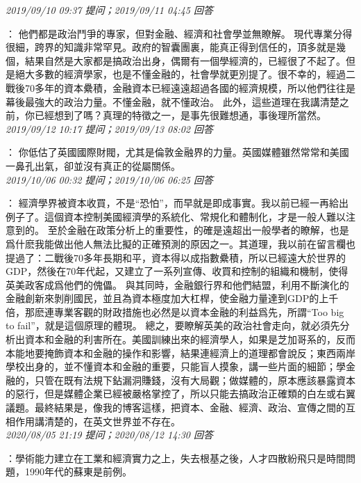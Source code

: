 \documentclass[twocolumn]{ctexart}
\begin{document}
\textit{\hfill\noindent\small 2019/09/10 09:37 提问；2019/09/11 04:45 回答}

：
他們都是政治鬥爭的專家，但對金融、經濟和社會學並無瞭解。 
現代專業分得很細，跨界的知識非常罕見。政府的智囊團裏，能真正得到信任的，頂多就是幾個，結果自然是大家都是搞政治出身，偶爾有一個學經濟的，已經很了不起了。但是絕大多數的經濟學家，也是不懂金融的，社會學就更別提了。很不幸的，經過二戰後70多年的資本纍積，金融資本已經遠遠超過各國的經濟規模，所以他們往往是幕後最強大的政治力量。不懂金融，就不懂政治。 
此外，這些道理在我講清楚之前，你已經想到了嗎？真理的特徵之一，是事先很難想通，事後理所當然。
\\

\textit{\hfill\noindent\small 2019/09/12 10:17 提问；2019/09/13 08:02 回答}

：
你低估了英國國際財閥，尤其是倫敦金融界的力量。英國媒體雖然常常和美國一鼻孔出氣，卻並沒有真正的從屬關係。
\\

\textit{\hfill\noindent\small 2019/10/06 00:32 提问；2019/10/06 06:25 回答}

：
經濟學界被資本收買，不是“恐怕”，而早就是即成事實。我以前已經一再給出例子了。這個資本控制美國經濟學的系統化、常規化和體制化，才是一般人難以注意到的。 
至於金融在政策分析上的重要性，的確是遠超出一般學者的瞭解，也是爲什麽我能做出他人無法比擬的正確預測的原因之一。其道理，我以前在留言欄也提過了：二戰後70多年長期和平，資本得以成指數纍積，所以已經遠大於世界的GDP，然後在70年代起，又建立了一系列宣傳、收買和控制的組織和機制，使得英美政客成爲他們的傀儡。 
與其同時，金融銀行界和他們結盟，利用不斷演化的金融創新來剝削國民，並且為資本極度加大杠桿，使金融力量達到GDP的上千倍，那麽連專業客觀的財政措施也必然是以資本金融的利益爲先，所謂“Too big to fail”，就是這個原理的體現。 
總之，要瞭解英美的政治社會走向，就必須先分析出資本和金融的利害所在。美國訓練出來的經濟學人，如果是芝加哥系的，反而本能地要掩飾資本和金融的操作和影響，結果連經濟上的道理都會說反；東西兩岸學校出身的，並不懂資本和金融的重要，只能盲人摸象，講一些片面的細節；學金融的，只管在既有法規下鉆漏洞賺錢，沒有大局觀；做媒體的，原本應該暴露資本的惡行，但是媒體企業已經被嚴格掌控了，所以只能去搞政治正確類的白左或右翼議題。最終結果是，像我的博客這樣，把資本、金融、經濟、政治、宣傳之間的互相作用講清楚的，在英文世界並不存在。
\\

\textit{\hfill\noindent\small 2020/08/05 21:19 提问；2020/08/12 14:30 回答}

：學術能力建立在工業和經濟實力之上，失去根基之後，人才四散紛飛只是時間問題，1990年代的蘇東是前例。
\\
\end{document}
